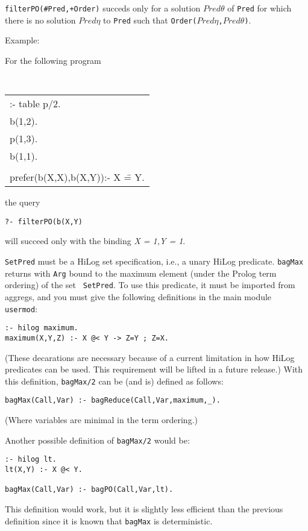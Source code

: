 \begin{description}
  

{\tt filterPO(\#Pred,+Order)} succeds only for a solution $Pred\theta$
of {\tt Pred} for which there is no solution $Pred\eta$ to {\tt Pred}
such that {\tt Order($Pred\eta$,$Pred\theta$)}.

Example:

For the following program
     \begin{center}
     {\tt
     \begin{tabular}{l}
          :- table p/2.	\\
          b(1,2).       \\
          p(1,3).       \\
          b(1,1).       \\
\\
	  prefer(b(X,X),b(X,Y)):- X \== Y. 
     \end{tabular}
     }
     \end{center}
the query 
\begin{center}
{\tt ?- filterPO(b(X,Y)}
\end{center}
will succeed only with the binding {\em X = 1,Y = 1}.

    {\tt SetPred} must be a HiLog set specification, i.e., a unary
    HiLog predicate.  {\tt bagMax} returns with {\tt Arg} bound to the
    maximum element (under the Prolog term ordering) of the set {\tt
    SetPred}.  To use this predicate, it must be imported from aggregs,
    and you must give the following definitions in the main module {\tt
    usermod}:
\begin{verbatim}
:- hilog maximum.
maximum(X,Y,Z) :- X @< Y -> Z=Y ; Z=X.
\end{verbatim}
    (These decarations are necessary because of a current limitation in
    how HiLog predicates can be used.  This requirement will be lifted in
    a future release.)  With this definition, {\tt bagMax/2} can be (and
    is) defined as follows:
\begin{verbatim}
bagMax(Call,Var) :- bagReduce(Call,Var,maximum,_).
\end{verbatim}
    (Where variables are minimal in the term ordering.)

Another possible definition of {\tt bagMax/2} would be:
\begin{verbatim}
:- hilog lt.
lt(X,Y) :- X @< Y.

bagMax(Call,Var) :- bagPO(Call,Var,lt).
\end{verbatim}
This definition would work, but it is slightly less efficient than the
previous definition since it is known that {\tt bagMax} is
deterministic.


\end{description}
